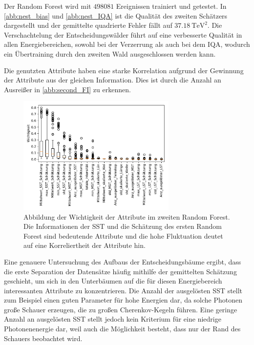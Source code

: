 Der Random Forest wird mit $\num{498081}$ Ereignissen trainiert und getestet.
In \autoref{abb:nest_bias} und \autoref{abb:nest_IQA} ist die Qualität des zweiten Schätzers dargestellt und der gemittelte quadrierte Fehler fällt
auf $\SI{37.18}{\tera\eV\squared}$.
Die Verschachtelung der Entscheidungswälder führt auf eine verbesserte Qualität in allen Energiebereichen, sowohl bei der Verzerrung als auch bei dem IQA,
wodurch ein Übertraining durch den zweiten Wald ausgeschlossen werden kann.

Die genutzten Attribute haben eine starke Korrelation aufgrund der Gewinnung der Attribute aus der gleichen Information.
Dies ist durch die Anzahl an Ausreißer in \autoref{abb:second_FI} zu erkennen.
\begin{figure}
  \includegraphics[width=0.7\textwidth]{Plots/feautureimportance_boxplot_secondForest.pdf}
  \centering
  \caption{Abbildung der Wichtigkeit der Attribute im zweiten Random Forest. Die Informationen der SST und die
          Schätzung des ersten Random Forest sind bedeutende Attribute und die hohe Fluktuation deutet auf eine
          Korreliertheit der Attribute hin.}
  \label{abb:second_FI}
\end{figure}
Eine genauere Untersuchung des Aufbaus der Entscheidungsbäume ergibt, dass die erste Separation der Datensätze häufig mithilfe der gemittelten Schätzung geschieht,
um sich in den Unterbäumen auf die für diesen Energiebereich interessanten Attribute zu konzentrieren.
Die Anzahl der ausgelösten SST stellt zum Beispiel einen guten Parameter für hohe Energien dar, da solche Photonen große Schauer erzeugen, die
zu großen Cherenkov-Kegeln führen.
Eine geringe Anzahl an ausgelösten SST stellt jedoch kein Kriterium für eine niedrige Photonenenergie dar, weil auch die Möglichkeit besteht, dass nur der
Rand des Schauers beobachtet wird.

